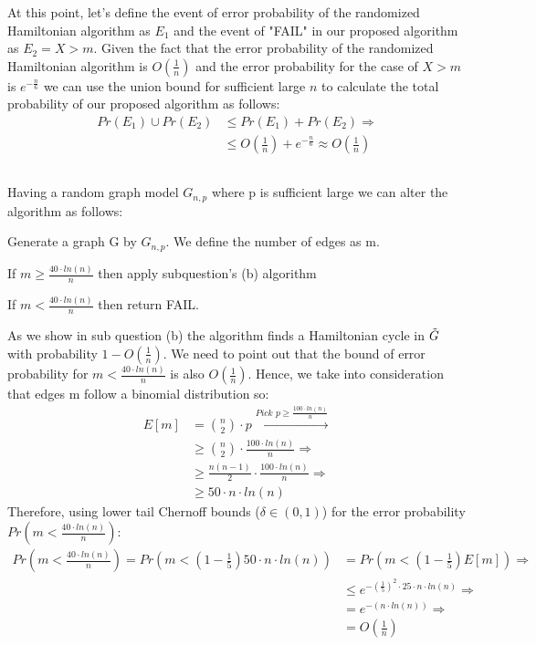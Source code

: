 \documentclass[11pt]{537homework}
\begin{document}
At this point, let's define the event of error probability of the randomized Hamiltonian algorithm as $E_1$ and the event of "FAIL" in our proposed algorithm as $E_2 = X>m$. Given the fact that the error probability of the randomized Hamiltonian algorithm is $O(\frac{1}{n})$ and the error probability for the case of $X>m$ is $e^{-\frac{n}{6}}$ we can use the union bound for sufficient large $n$ to calculate the total probability of our proposed algorithm as follows:
\begin{align*}
Pr(E_1) \cup Pr(E_2)  &\leq  Pr(E_1) + Pr(E_2) \Longrightarrow \\ 
&\leq O(\frac{1}{n}) + e^{-\frac{n}{6}} \approx O(\frac{1}{n})
\end{align*}
\subsection{} 
Having a random graph model $G_{n,p}$ where p is sufficient large we can alter the algorithm as follows:
\begin{description}[font=$\bullet$~\normalfont]
\item Generate a graph G by $G_{n,p}$. We define the number of edges as m.
\item If $m \geq \frac{40 \cdot ln(n)}{n}$ then apply subquestion's (b) algorithm 
\item If $m < \frac{40 \cdot ln(n)}{n}$ then return FAIL.
\end{description}
As we show in sub question (b) the algorithm finds a Hamiltonian cycle in $\Tilde{G}$ with probability $1- O(\frac{1}{n})$. We need to point out that the bound of error probability for $m < \frac{40 \cdot ln(n)}{n}$ is also $O(\frac{1}{n})$. Hence, we take into consideration that edges m follow a binomial distribution so: 
\begin{align*}
    E[m] &= {n \choose 2} \cdot p \xrightarrow{\textit{Pick p} \geq \frac{100 \cdot ln(n)}{n}} \\
         &\geq {n \choose 2} \cdot \frac{100 \cdot ln(n)}{n} \Longrightarrow \\
         &\geq \frac{n(n-1)}{2} \cdot \frac{100 \cdot ln(n)}{n} \Longrightarrow \\
         &\geq 50 \cdot n \cdot ln(n) 
\end{align*}
Therefore, using lower tail Chernoff bounds ($\delta \in (0,1)$) for the error probability $Pr(m  < \frac{40 \cdot ln(n)}{n})$:
\begin{align*}
    Pr(m  < \frac{40 \cdot ln(n)}{n}) = Pr(m  < (1 - \frac{1}{5}) 50 \cdot n \cdot ln(n)) &= Pr(m < (1 - \frac{1}{5}) E[m]) \Longrightarrow \\
    &\leq e^{-(\frac{1}{5})^2 \cdot 25 \cdot n \cdot ln(n)} \Longrightarrow \\
    &= e^{-(n \cdot ln(n))} \Longrightarrow \\
    &= O(\frac{1}{n})
\end{align*}
\end{document}
